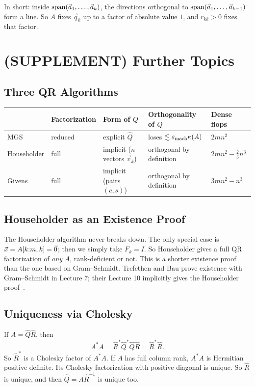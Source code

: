 In short: inside $\operatorname{span}(\vec{a}_1, \dots, \vec{a}_k)$, the directions orthogonal to $\operatorname{span}(\vec{a}_1, \dots, \vec{a}_{k-1})$ form a line. So $A$ fixes $\vec{q}_k$ up to a factor of absolute value $1$, and $r_{kk} > 0$ fixes that factor.

\section{(SUPPLEMENT) Further Topics}
\subsection{Three QR Algorithms}

\begin{center}
\begin{tabular}{lllll}
  \toprule
  & Factorization & Form of $Q$ & Orthogonality of $Q$ & Dense flops \\
  \midrule
  MGS & reduced & explicit $\hat{Q}$ & loses $\lesssim\varepsilon_{\mathrm{mach}}\kappa(A)$ & $2mn^2$ \\
  Householder & full & implicit ($n$ vectors $\vec{v}_k$) & orthogonal by definition & $2mn^2 - \frac{2}{3}n^3$ \\
  Givens & full & implicit (pairs $(c, s)$) & orthogonal by definition & $3mn^2 - n^3$ \\
  \bottomrule
\end{tabular}
\end{center}

\subsection{Householder as an Existence Proof}

The Householder algorithm never breaks down. The only special case is $\vec{x} = A[k{:}m, k] = \vec{0}$; then we simply take $F_k = I$. So Householder gives a full QR factorization of \emph{any} $A$, rank-deficient or not. This is a shorter existence proof than the one based on Gram--Schmidt. Trefethen and Bau prove existence with Gram--Schmidt in Lecture 7; their Lecture 10 implicitly gives the Householder proof~\cite{TB}.

\subsection{Uniqueness via Cholesky}

If $A = \hat{Q}\hat{R}$, then
\begin{equation}
  A^\ast A = \hat{R}^\ast\hat{Q}^\ast\hat{Q}\hat{R} = \hat{R}^\ast\hat{R}.
\end{equation}
So $\hat{R}^\ast$ is a Cholesky factor of $A^\ast A$. If $A$ has full column rank, $A^\ast A$ is Hermitian positive definite. Its Cholesky factorization with positive diagonal is unique. So $\hat{R}$ is unique, and then $\hat{Q} = A\hat{R}^{-1}$ is unique too.

